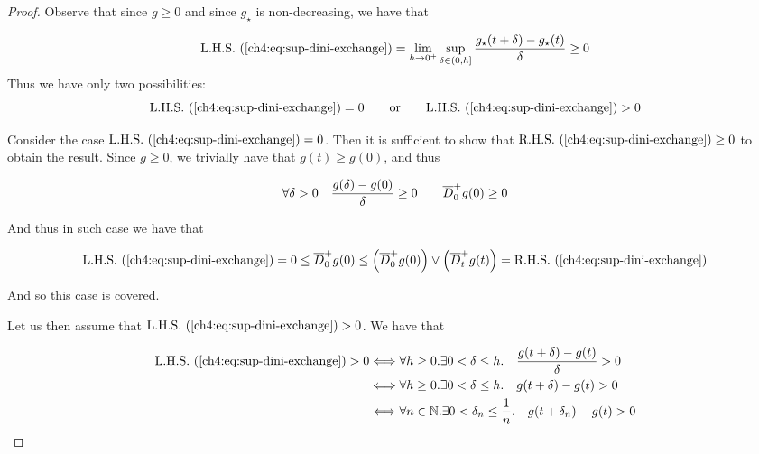 \begin{proof}
Observe that since $g \geq 0$ and since $g_\star$ is non-decreasing, we have that

\begin{equation}
	\mbox{L.H.S.\ } (\ref{ch4:eq:sup-dini-exchange}) = \lim_{h\rightarrow 0^+} \sup_{\delta \in (0,h]} \frac{g_\star(t+\delta) - g_\star(t)}{\delta} \geq 0
\end{equation}
Thus we have only two possibilities:
\begin{equation}
	\mbox{L.H.S.\ } (\ref{ch4:eq:sup-dini-exchange}) = 0 
	\qquad \text{or} \qquad
	\mbox{L.H.S.\ } (\ref{ch4:eq:sup-dini-exchange}) > 0 
\end{equation}

Consider the case $\mbox{L.H.S.\ } (\ref{ch4:eq:sup-dini-exchange}) = 0$.
Then it is sufficient to show that $\mbox{R.H.S.\ } (\ref{ch4:eq:sup-dini-exchange}) \geq 0$ to obtain the result.
Since $g \geq 0$, we trivially have that $g(t) \geq g(0)$, and thus

\begin{equation}
	\forall \delta >0 \quad \frac{g(\delta) - g(0)}{\delta} \geq 0
	\qquad
	\overline{D}_0^+g(0) \geq 0	
\end{equation}

And thus in such case we have that

\begin{equation}
	\mbox{L.H.S.\ } (\ref{ch4:eq:sup-dini-exchange}) = 0 
	\leq
	\overline{D}_0^+g(0)
	\leq
		\left(
		\overline{D}^+_0 g(0)
		\right)
		\vee 
		\left(
		\overline{D}^+_t g(t)
		\right) 
	=
	\mbox{R.H.S.\ } (\ref{ch4:eq:sup-dini-exchange})
\end{equation}

And so this case is covered.

Let us then assume that $\mbox{L.H.S.\ } (\ref{ch4:eq:sup-dini-exchange}) > 0 $.
We have that

\begin{equation}
\begin{aligned}
	\mbox{L.H.S.\ } (\ref{ch4:eq:sup-dini-exchange}) > 0 
	& \Longleftrightarrow 
		\forall h \geq 0. \exists 0< \delta \leq h. 
		\quad
		\frac{g(t + \delta) - g(t)}{\delta} > 0
	\\
	& \Longleftrightarrow 
		\forall h \geq 0. \exists 0< \delta \leq h. 
		\quad
		g(t + \delta) - g(t)> 0
	\\
	& \Longleftrightarrow 
		\forall n \in \mathbb{N}. \exists 0< \delta_n \leq \frac{1}{n}. 
		\quad
		g(t + \delta_n) - g(t)> 0
		\label{ch4:cond:proof-dini-T1}
\end{aligned}
\end{equation}


\end{proof}
